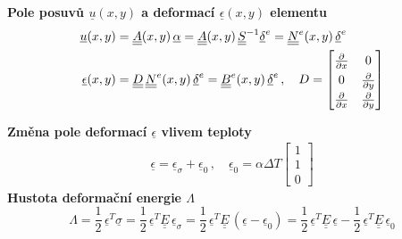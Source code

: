 \documentclass[10pt,oneside]{article}
\newcommand{\tenz}[1]{\vec{\vec{#1}}}
\newcommand{\ul}[1]{\underline{#1}}
\newcommand{\ull}[1]{\underline{\underline{#1}}}
\begin{document}
%
\textbf{Pole posuvů $\ul{u}(x,y)$ a deformací $\ul{\epsilon}(x,y)$ elementu}
%
\begin{align*}
	\ul{u}(x,y) &= \ull{A}(x,y)\,\ul{\alpha} = \ull{A}(x,y)\,\ull{S}^{-1} \ul{\delta}^e = \ull{N}^e(x,y)\,\ul{\delta}^e\\
	\ul{\epsilon}(x,y) &= \ull{D}\,\ull{N}^e(x,y)\,\ul{\delta}^e = \ull{B}^e(x,y)\,\ul{\delta}^e
	\,,\quad
	D = \renewcommand\arraystretch{1.3}
	\begin{bmatrix}
	\frac{\partial}{\partial x} & 0 \\
	0 & \frac{\partial}{\partial y} \\
	\frac{\partial}{\partial x} & \frac{\partial}{\partial y}
	\end{bmatrix}
\end{align*}
%

\textbf{Změna pole deformací $\ul{\epsilon}$ vlivem teploty}
%
\begin{align*}
	\ul{\epsilon} = \ul{\epsilon}_\sigma + \ul{\epsilon}_0 \,,\quad \ul{\epsilon}_0 = \alpha \Delta T \begin{bmatrix}1\\1\\0\end{bmatrix}
\end{align*}
%
\textbf{Hustota deformační energie $\Lambda$}
\begin{equation*}
	\Lambda = \frac{1}{2}\,\ul{\epsilon}^T \ul{\sigma}
		= \frac{1}{2}\,\ul{\epsilon}^T \ull{E}\,\ul{\epsilon}_\sigma
		= \frac{1}{2}\,\ul{\epsilon}^T \ull{E}\,(\ul{\epsilon} - \ul{\epsilon}_0)
		= \frac{1}{2}\,\ul{\epsilon}^T \ull{E}\,\ul{\epsilon} - \frac{1}{2}\,\ul{\epsilon}^T \ull{E}\,\ul{\epsilon}_0
\end{equation*}
\end{document}

